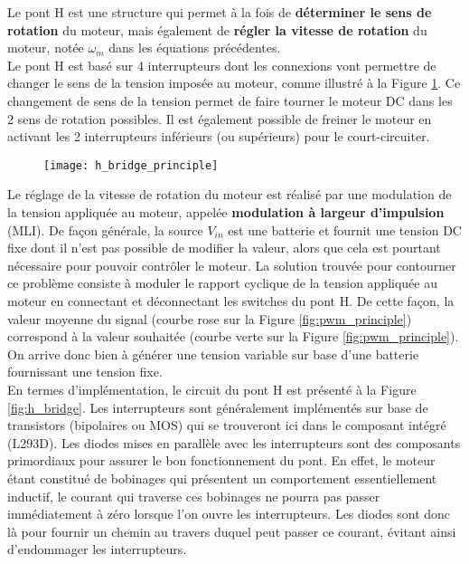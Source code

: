 Le pont H est une structure qui permet à la fois de \textbf{déterminer le sens de rotation} du moteur, mais également de \textbf{régler la vitesse de rotation} du moteur, notée $\omega_m$ dans les équations précédentes.\\

Le pont H est basé sur 4 interrupteurs dont les connexions vont permettre de changer le sens de la tension imposée au moteur, comme illustré à la Figure \ref{fig:h_bridge_principle}. Ce changement de sens de la tension permet de faire tourner le moteur DC dans les 2 sens de rotation possibles. Il est également possible de freiner le moteur en activant les 2 interrupteurs inférieurs (ou supérieurs) pour le court-circuiter. \\

\begin{figure}[!ht]
	\centering
	\texttt{[image: h\_bridge\_principle]}
	\label{fig:h_bridge_principle}
\end{figure}

Le réglage de la vitesse de rotation du moteur est réalisé par une modulation de la tension appliquée au moteur, appelée \textbf{modulation à largeur d'impulsion} (MLI). De façon générale, la source $V_{in}$ est une batterie et fournit une tension DC fixe dont il n'est pas possible de modifier la valeur, alors que cela est pourtant nécessaire pour pouvoir contrôler le moteur. La solution trouvée pour contourner ce problème consiste à moduler le rapport cyclique de la tension appliquée au moteur en connectant et déconnectant les switches du pont H. De cette façon, la valeur moyenne du signal (courbe rose sur la Figure \ref{fig:pwm_principle}) correspond à la valeur souhaitée (courbe verte sur la Figure \ref{fig:pwm_principle}). On arrive donc bien à générer une tension variable sur base d'une batterie fournissant une tension fixe.\\

En termes d'implémentation, le circuit du pont H est présenté à la Figure \ref{fig:h_bridge}. Les interrupteurs sont généralement implémentés sur base de transistors (bipolaires ou MOS) qui se trouveront ici dans le composant intégré (L293D). Les diodes mises en parallèle avec les interrupteurs sont des composants primordiaux pour assurer le bon fonctionnement du pont. En effet, le moteur étant constitué de bobinages qui présentent un comportement essentiellement inductif, le courant qui traverse ces bobinages ne pourra pas passer immédiatement à zéro lorsque l'on ouvre les interrupteurs. Les diodes sont donc là pour fournir un chemin au travers duquel peut passer ce courant, évitant ainsi d'endommager les interrupteurs.

